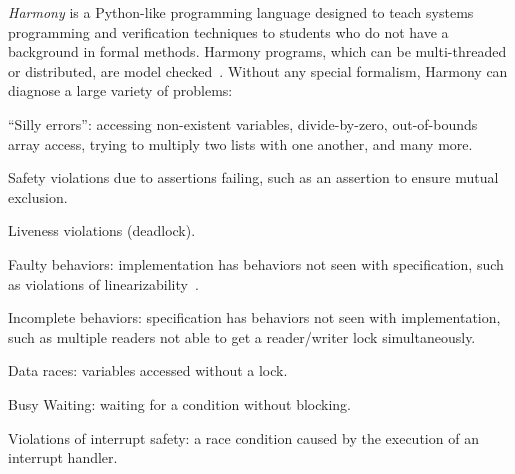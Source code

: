 \documentclass[twocolumn]{article}
\begin{document}
\emph{Harmony} is a Python-like programming language designed to teach
systems programming and verification techniques to students who do not have a
background in formal methods.  Harmony programs, which can be multi-threaded
or distributed, are model checked~\cite{CES86}.
Without any special formalism, Harmony can diagnose a large variety
of problems:
\begin{compactitem}
\item ``Silly errors'': accessing non-existent variables,
divide-by-zero, out-of-bounds array access, trying to multiply two lists
with one another, and many more.
\item Safety violations due to assertions failing, such as an assertion to ensure mutual exclusion.
\item Liveness violations (deadlock).
\item Faulty behaviors: implementation has behaviors not seen with specification, such as violations of linearizability~\cite{HW90}.
\item Incomplete behaviors: specification has behaviors not seen with implementation, such as multiple readers not able to get a reader/writer lock simultaneously.
\item Data races: variables accessed without a lock.
\item Busy Waiting: waiting for a condition without blocking.
\item Violations of interrupt safety: a race condition caused by the execution
of an interrupt handler.
\end{compactitem}
\end{document}
